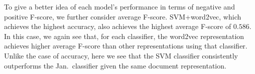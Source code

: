 \documentclass[11pt]{article}
\newcommand\test{\textsc{test}\xspace}
\begin{document}
To give a better idea of each model's performance in terms of negative
and positive F-score, we further consider average
F-score. SVM+word2vec, which achieves the highest accuracy, also
achieves the highest average F-score of $0.586$. In this case, we
again see that, for each classifier, the word2vec representation
achieves higher average F-score than other representations using that
classifier. Unlike the case of accuracy, here we see that the SVM
classifier consistently outperforms the Jan.\ classifier given the
same document representation.


\end{document}

